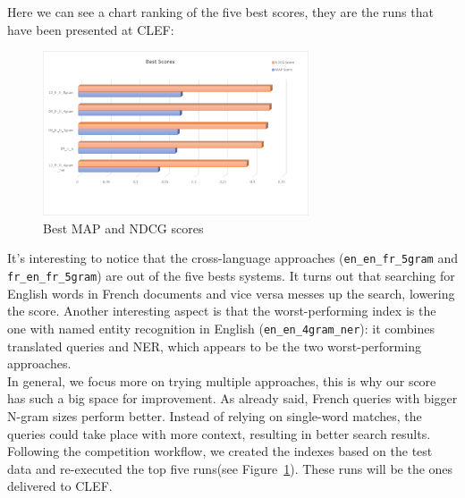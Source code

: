 Here we can see a chart ranking of the five best scores, they are the runs that have been presented at CLEF:
\begin{figure}[h!]
	\centering
	\includegraphics[width=0.7\textwidth]{figure/bestScores.png}
	\caption{Best MAP and NDCG scores}
	\label{fig:best_scores}
\end{figure}

It's interesting to notice that the cross-language approaches (\texttt{en\_en\_fr\_5gram} and
\texttt{fr\_en\_fr\_5gram}) are out of the five bests systems.
It turns out that searching for English words in French documents and vice versa messes up the search, lowering the
score.
Another interesting aspect is that the worst-performing index is the one with named entity recognition in English
(\texttt{en\_en\_4gram\_ner}): it combines translated queries and NER, which appears to be the two worst-performing
approaches.\\

In general, we focus more on trying multiple approaches, this is why our score has such a big space for improvement.
As already said, French queries with bigger N-gram sizes perform better.
Instead of relying on single-word matches, the queries could take place with more context, resulting in better search
results.\\

Following the competition workflow, we created the indexes based on the test data and re-executed the top five
runs(see Figure~\ref{fig:best_scores}).
These runs will be the ones delivered to CLEF\@.